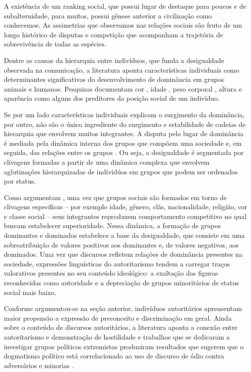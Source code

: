 \documentclass[
12pt,				%
openright,			%
twoside,			%
a4paper,			%
english,			%
french,				%
spanish,			%
brazil				%
]{abntex2}
\begin{document}
A existência de um ranking social, que possui lugar de destaque para poucos e de subalternidade, para muitos, possui gênese anterior a civilização como conhecemos. As assimetrias que observamos nas relações sociais são fruto de um longo histórico de disputas e competição que acompanham a trajetória de sobrevivência de todas as espécies. 

Dentre as causas da hierarquia entre indivíduos, que funda a desigualdade observada na comunicação, a literatura aponta características individuais como determinantes significativos do desenvolvimento de dominância em grupos animais e humanos. Pesquisas documentam cor \cite{bakker1983determinants}, idade \cite{cote2000dominance, bohlin2001determinants}, peso corporal \cite{morgan2000predictors}, altura \cite{huang2002camera} e aparência \cite{lawson2010looking, lodge2013rationalizing} como alguns dos preditores da posição social de um indivíduo.    

Se por um lado características individuais explicam o surgimento da dominância, por outro, não são o único ingrediente do surgimento e estabilidade de cadeias de hierarquia que envolvem muitos integrantes. A disputa pelo lugar de dominância é mediada pela dinâmica interna dos grupos que compõem uma sociedade \cite{ridgeway1989dominance} e, em seguida, das relações entre os grupos \cite{chase1980social,chase2002individual}. Ou seja, a desigualdade é segmentada por clivagens formadas a partir de uma dinâmica complexa que envolvem aglutinações hierarquizadas de individúos em grupos que podem ser ordenados por status.  

Como argumentam , uma vez que grupos sociais são formados em torno de clivagens específicas -- por exemplo idade, gênero, clãs, nacionalidade, religião, cor e classe social -- seus integrantes reproduzem comportamento competitivo no qual buscam estabelecer superioridade. Nessa dinâmica, a formação de grupos dominantes e dominados estabelece a base da desigualdade, que consiste em uma sobreatribuição de valores positivos aos dominantes e, de valores negativos, aos dominados. Uma vez que discursos refletem relações de dominância presentes na sociedade, expressões linguísticas do autoritarismo tendem a carregar traços valorativos presentes no seu conteúdo ideológico: a exaltação das figuras reconhecidas como autoridade e a depreciação de grupos minoritários de status social mais baixo. 

Conforme argumentou-se na seção anterior, indivíduos autoritários aprensentam maior propensão a expressão de preconceito e discriminação em geral. Ainda sobre o conteúdo de discursos autoritários, a literatura aponta a conexão entre autoritarismo e demonstração de hostilidade \cite{siegel1956relationship} e trabalhos que se dedicaram a investigar grupos políticos extremistas produziram resultados que sugerem que o dogmatismo político está correlacionado ao uso de discurso de ódio contra adversários e minorias \cite{gerstenfeld2003hate, ben2016hate}.  
\end{document}
